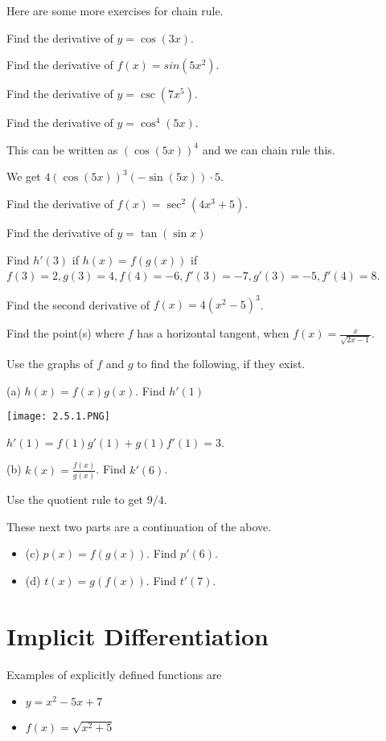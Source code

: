 \documentclass[../bccalc.tex]{subfiles}
\begin{document}
Here are some more exercises for chain rule.

\ex Find the derivative of $y=\cos(3x)$.

\ex Find the derivative of $f(x)=sin(5x^2)$.

\ex Find the derivative of $y=\csc(7x^5)$.

\begin{example}
    Find the derivative of $y=\cos^4 (5x)$.

    This can be written as $(\cos(5x))^4$ and we can chain rule this.

    We get $4(\cos(5x))^3(-\sin(5x))\cdot 5$.
\end{example}

\ex Find the derivative of $f(x)=\sec^2 (4x^3+5)$.

\ex Find the derivative of $y=\tan(\sin x)$

\ex Find $h'(3)$ if $h(x)=f(g(x))$ if $f(3)=2, g(3)=4, f(4)=-6, f'(3)=-7, g'(3)=-5, f'(4)=8$.

\ex Find the second derivative of $f(x)=4(x^2-5)^3$.

\ex Find the point(s) where $f$ has a horizontal tangent, when $f(x)=\frac{x}{\sqrt{2x-1}}$.

\begin{example}
    Use the graphs of $f$ and $g$ to find the following, if they exist.

    (a) $h(x)=f(x)g(x)$. Find $h'(1)$
    \begin{center}
        \texttt{[image: 2.5.1.PNG]}
    \end{center}

    $h'(1)=f(1)g'(1)+g(1)f'(1) = 3$.

    (b) $k(x)=\frac{f(x)}{g(x)}$. Find $k'(6)$.

    Use the quotient rule to get $9/4$.
\end{example}

\ex These next two parts are a continuation of the above.
\begin{itemize}
    \item (c) $p(x)=f(g(x))$. Find $p'(6)$.
    \item (d) $t(x)=g(f(x))$. Find $t'(7)$.
\end{itemize}


\section{Implicit Differentiation}
Examples of explicitly defined functions are 
\begin{itemize}
    \item $y=x^2-5x+7$
    \item $f(x)=\sqrt{x^2+5}$
\end{itemize}
\end{document}
